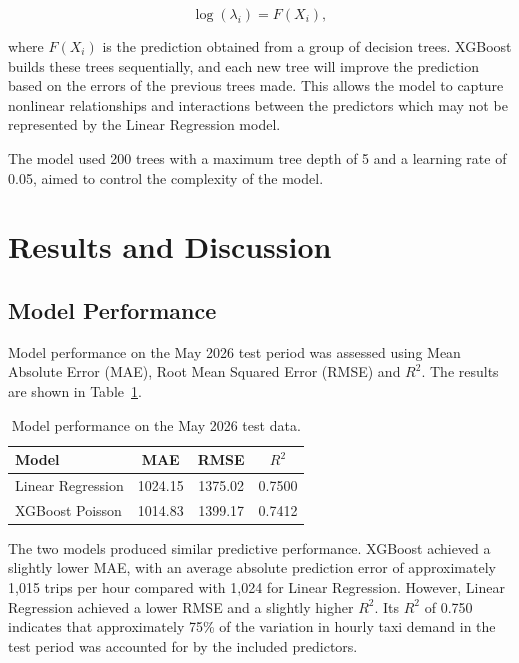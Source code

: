\documentclass[11pt]{article}
\begin{document}
\[
\log(\lambda_i) = F(X_i),
\]

where $F(X_i)$ is the prediction obtained from a group of decision trees.
XGBoost builds these trees sequentially, and each new tree will improve the prediction
based on the errors of the previous trees made. This allows the model to capture nonlinear
relationships and interactions between the predictors which may not be represented
by the Linear Regression model.

The model used 200 trees with a maximum tree depth of 5 and a learning rate of 0.05, aimed to control the complexity of the model.


\section{Results and Discussion}

\subsection{Model Performance}

Model performance on the May 2026 test period was assessed using Mean Absolute Error
(MAE), Root Mean Squared Error (RMSE) and $R^2$. The results are shown in
Table~\ref{tab:model_results}.

\begin{table}[H]
    \centering
    \caption{Model performance on the May 2026 test data.}
    \label{tab:model_results}
    \begin{tabular}{lccc}
        \toprule
        Model & MAE & RMSE & $R^2$ \\
        \midrule
        Linear Regression & 1024.15 & 1375.02 & 0.7500 \\
        XGBoost Poisson & 1014.83 & 1399.17 & 0.7412 \\
        \bottomrule
    \end{tabular}
\end{table}

The two models produced similar predictive performance. XGBoost achieved a slightly
lower MAE, with an average absolute prediction error of approximately 1,015 trips
per hour compared with 1,024 for Linear Regression. However, Linear Regression
achieved a lower RMSE and a slightly higher $R^2$. Its $R^2$ of 0.750 indicates
that approximately 75\% of the variation in hourly taxi demand in the test period
was accounted for by the included predictors.
\end{document}
